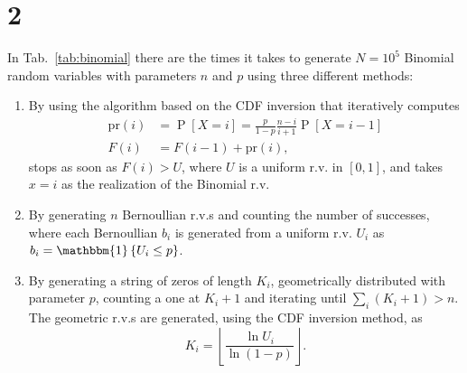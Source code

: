 \documentclass[a4paper,oneside]{article}
\newcommand{\floor}[1]{\left\lfloor#1\right\rfloor}
\newcommand{\Prob}[1]{\operatorname{P}\left[#1\right]}
\newcommand{\ind}[1]{\operatorname{\mathbbm{1}}\left\{#1\right\}}
\begin{document}
\section*{2}
In Tab.~\ref{tab:binomial} there are the times it takes to generate
$N=10^5$ Binomial random variables with parameters $n$ and $p$ using
three different methods:
\begin{enumerate}
\item By using the algorithm based on the CDF inversion that
  iteratively computes
  \begin{align*}
    \mathrm{pr}(i) &= \Prob{X = i} = \frac{p}{1-p}\frac{n-i}{i+1}\Prob{X = i-1} \\
    F(i) &= F(i-1) + \mathrm{pr}(i) ,
  \end{align*}
  stops as soon as $F(i) > U$, where $U$ is a uniform r.v. in $[0,
    1]$, and takes $x = i$ as the realization of the Binomial r.v.
  \item By generating $n$ Bernoullian r.v.s and counting the number of
    successes, where each Bernoullian $b_i$ is generated from a uniform
    r.v. $U_i$ as $b_i = \ind{U_i \leq p}$.
  \item By generating a string of zeros of length $K_i$, geometrically
    distributed with parameter $p$, counting a one at $K_i+1$ and
    iterating until $\sum_i \left( K_i + 1 \right) > n$. The geometric
    r.v.s are generated, using the CDF inversion method, as
    \[ K_i = \floor{\frac{\ln U_i}{\ln (1 - p)}} . \]
\end{enumerate}
\end{document}
